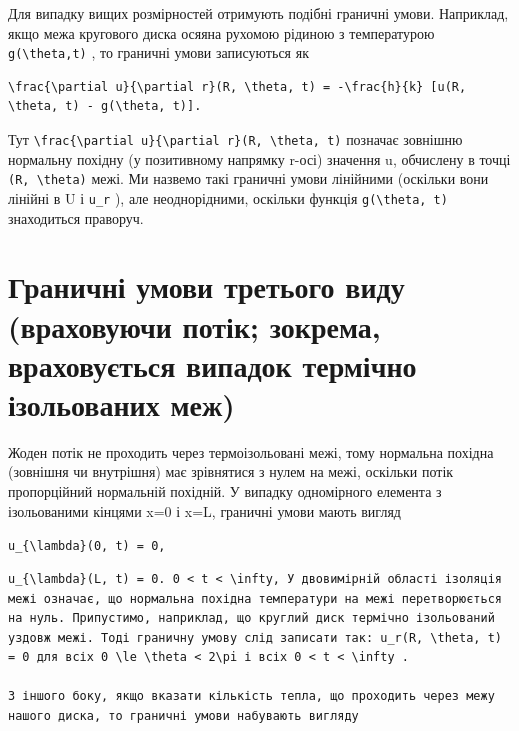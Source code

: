 \documentclass[
  ukrainian,
]{article}
\begin{document}
Для випадку вищих розмірностей отримують подібні граничні умови.
Наприклад, якщо межа кругового диска осяяна рухомою рідиною з
температурою \texttt{g(\textbackslash{}theta,t)} , то граничні умови
записуються як

\begin{verbatim}
\frac{\partial u}{\partial r}(R, \theta, t) = -\frac{h}{k} [u(R, \theta, t) - g(\theta, t)].
\end{verbatim}

Тут
\texttt{\textbackslash{}frac\{\textbackslash{}partial\ u\}\{\textbackslash{}partial\ r\}(R,\ \textbackslash{}theta,\ t)}
позначає зовнішню нормальну похідну (у позитивному напрямку r-осі)
значення u, обчислену в точці \texttt{(R,\ \textbackslash{}theta)} межі.
Ми назвемо такі граничні умови лінійними (оскільки вони лінійні в U і
\texttt{u\_r} ), але неоднорідними, оскільки функція
\texttt{g(\textbackslash{}theta,\ t)} знаходиться праворуч.

\section{Граничні умови третього виду (враховуючи потік; зокрема,
враховується випадок термічно ізольованих
меж)}\label{ux433ux440ux430ux43dux438ux447ux43dux456-ux443ux43cux43eux432ux438-ux442ux440ux435ux442ux44cux43eux433ux43e-ux432ux438ux434ux443-ux432ux440ux430ux445ux43eux432ux443ux44eux447ux438-ux43fux43eux442ux456ux43a-ux437ux43eux43aux440ux435ux43cux430-ux432ux440ux430ux445ux43eux432ux443ux454ux442ux44cux441ux44f-ux432ux438ux43fux430ux434ux43eux43a-ux442ux435ux440ux43cux456ux447ux43dux43e-ux456ux437ux43eux43bux44cux43eux432ux430ux43dux438ux445-ux43cux435ux436}

Жоден потік не проходить через термоізольовані межі, тому нормальна
похідна (зовнішня чи внутрішня) має зрівнятися з нулем на межі, оскільки
потік пропорційний нормальній похідній. У випадку одномірного елемента з
ізольованими кінцями x=0 і x=L, граничні умови мають вигляд

\texttt{\textquotesingle{}u\_\{\textbackslash{}lambda\}\textquotesingle{}(0,\ t)\ =\ 0,}

\begin{verbatim}
u_{\lambda}(L, t) = 0. 0 < t < \infty, У двовимірній області ізоляція межі означає, що нормальна похідна температури на межі перетворюється на нуль. Припустимо, наприклад, що круглий диск термічно ізольований уздовж межі. Тоді граничну умову слід записати так: u_r(R, \theta, t) = 0 для всіх 0 \le \theta < 2\pi і всіх 0 < t < \infty .

З іншого боку, якщо вказати кількість тепла, що проходить через межу нашого диска, то граничні умови набувають вигляду
\end{verbatim}
\end{document}
